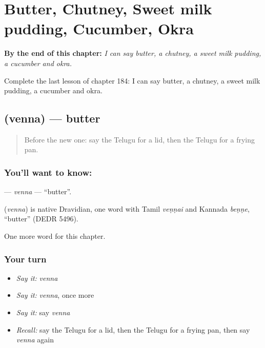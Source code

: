 
\chapter{Butter, Chutney, Sweet milk pudding, Cucumber, Okra}
\label{ch:te-butter-chutney-sweet-milk-pudding-cucumber-okra}

\begin{chapteropening}
\textbf{By the end of this chapter:} \emph{I can say butter, a chutney, a sweet milk pudding, a cucumber and okra.}

Complete the last lesson of chapter 184: I can say butter, a chutney, a sweet milk pudding, a cucumber and okra.
\end{chapteropening}

\section[\texorpdfstring{\te{వెన్న} (venna)}{వెన్న (venna)}]{ (venna) — butter}

\label{lesson:TE-C184-venna}



\begin{quote}
Before the new one: say the Telugu for a lid, then the Telugu for a frying pan.
\end{quote}

\subsection*{You'll want to know: }
\textbf{} — \emph{venna} — \textquotedblleft{}butter\textquotedblright{}.

\begin{cousinweb}
\textbf{} (\emph{venna}) is native Dravidian, one word with Tamil \emph{veṇṇai} and Kannada \emph{beṇṇe}, \textquotedblleft{}butter\textquotedblright{} (DEDR 5496).
\end{cousinweb}

\begin{grammarlens}[title={What you've built}]
One more word for this chapter.
\end{grammarlens}

\subsection*{Your turn}
\begin{itemize}
\raggedright
  \item \emph{Say it:} \emph{venna}
  \item \emph{Say it:} \emph{venna}, once more
  \item \emph{Say it:} say \emph{venna}
  \item \emph{Recall:} say the Telugu for a lid, then the Telugu for a frying pan, then say \emph{venna} again
\end{itemize}

